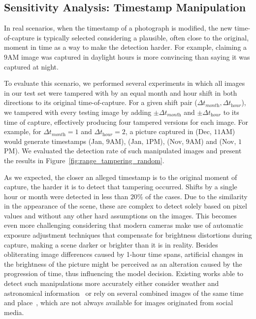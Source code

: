 \documentclass[journal]{IEEEtran}
\begin{document}
        

    \subsection{Sensitivity Analysis: Timestamp Manipulation}\label{sec:sensitivity_timestamp}
        In real scenarios, when the timestamp of a photograph is modified, the new time-of-capture is typically selected considering a plausible, often close to the original, moment in time as a way to make the detection harder. For example, claiming a $9$\textsc{AM} image was captured in daylight hours is more convincing than saying it was captured at night.
        
        To evaluate this scenario, we performed several experiments in which all images in our test set were tampered with by an equal month and hour shift in both directions to its original time-of-capture. For a given shift pair ($\Delta t_{\textit{month}}, \Delta t_{\textit{hour}}$), we tampered with every testing image by adding $\pm\Delta t_{\textit{month}}$ and $\pm\Delta t_{\textit{hour}}$ to its time of capture, effectively producing four tampered versions for each image. For example, for $\Delta t_{\textit{month}} = 1$ and $\Delta t_{\textit{hour}} = 2$, a picture captured in (Dec, $11$\textsc{AM}) would generate timestamps (Jan, $9$\textsc{AM}), (Jan, $1$\textsc{PM}), (Nov, $9$\textsc{AM}) and (Nov, $1$\textsc{PM}). We evaluated the detection rate of such manipulated images and present the results in Figure~\ref{fig:range_tampering_random}. 
    
        As we expected, the closer an alleged timestamp is to the original moment of capture, the harder it is to detect that tampering occurred. Shifts by a single hour or month were detected in less than $20\%$ of the cases. Due to the similarity in the appearance of the scene, these are complex to detect solely based on pixel values and without any other hard assumptions on the images. This becomes even more challenging considering that modern cameras make use of automatic exposure adjustment techniques that compensate for brightness distortions during capture, making a scene darker or brighter than it is in reality.  Besides obliterating image differences caused by 1-hour time spans, artificial changes in the brightness of the picture might be perceived as an alteration caused by the progression of time, thus influencing the model decision. Existing works able to detect such manipulations more accurately either consider weather and astronomical information~\cite{ghosh2017detection} or rely on several combined images of the same time and place~\cite{chen2019deep}, which are not always available for images originated from social media.
        
\end{document}
